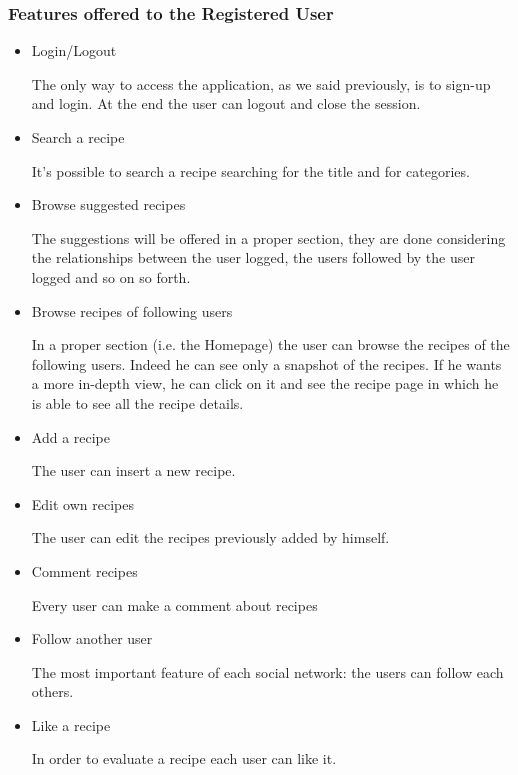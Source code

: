 \documentclass[a4paper]{report}
\begin{document}
\subsubsection{Features offered to the Registered User}
\begin{itemize}
	\item Login/Logout
	
	\noindent The only way to access the application, as we said previously, is to sign-up and login. At the end the user can logout and close the session.
	
	\item Search a recipe
	
	\noindent It's possible to search a recipe searching for the title and for categories.
	
	\item Browse suggested recipes
	
	\noindent The suggestions will be offered in a proper section, they are done considering the relationships between the user logged, the users followed by the user logged and so on so forth.
	
	\item Browse recipes of following users
	
	\noindent In a proper section (i.e. the Homepage) the user can browse the recipes of the following users. Indeed he can see only a snapshot of the recipes. If he wants a more in-depth view, he can click on it and see the recipe page in which he is able to see all the recipe details. 
	
	\item Add a recipe
	
	\noindent The user can insert a new recipe.
	
	\item Edit own recipes
	
	\noindent The user can edit the recipes previously added by himself.
	
	\item Comment recipes
	
	\noindent
	Every user can make a comment about recipes
	
	\item Follow another user
	
	\noindent The most important feature of each social network: the users can follow each others. 
	
	
	\item Like a recipe
	
	\noindent In order to evaluate a recipe each user can like it.
\end{itemize}
\end{document}
